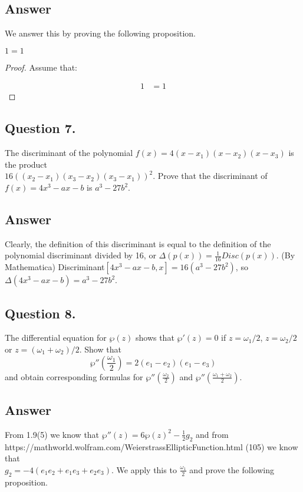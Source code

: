 \subsection*{Answer}
\noindent
We answer this by proving the following proposition.

\begin{proposition}
    $1=1$
\end{proposition}

\begin{proof}
    Assume that:

    \begin{align*}
        1 &= 1
    \end{align*}

\end{proof}


\subsection{Question 7.}
\noindent
The discriminant of the polynomial $f(x) = 4(x - x_1)(x - x_2)(x - x_3)$ is the product \\
$16((x_2 - x_1)(x_3 - x_2)(x_3 - x_1))^2$. Prove that the discriminant of $f(x) =  4x^3 - a x - b$ is $a^3 - 27b^2$.

\subsection*{Answer}
Clearly, the definition of this discriminant is equal to the definition of the polynomial discriminant divided by 16,
or $\Delta(p(x)) = \frac{1}{16} Disc(p(x))$. (By Mathematica) Discriminant$[4x^3 - a x - b, x]=16 (a^3 - 27 b^2)$, so
$\Delta(4x^3 - a x - b) =a^3 - 27b^2$.


\subsection{Question 8.}
\noindent
The differential equation for $\wp(z)$ shows that $\wp'(z)=0$ if $z=\omega_1 / 2$, $z=\omega_2 / 2$ or
$z=(\omega_1 + \omega_2) / 2$. Show that
\[
    \wp''(\frac{\omega_1}{2}) = 2 (e_1 - e_2)(e_1 - e_3)
\]
and obtain corresponding formulas for $\wp''(\frac{\omega_2}{2})$ and $\wp''(\frac{\omega_1 + \omega_2}{2})$.

\subsection*{Answer}
\noindent
From 1.9(5) we know that $\wp''(z)=6{\wp(z)}^2-\frac{1}{2}g_2$ and from\\
https://mathworld.wolfram.com/WeierstrassEllipticFunction.html (105) we know that\\
$g_2=-4(e_1 e_2 + e_1 e_3 + e_2 e_3)$. We apply this to $\frac{\omega_1}{2}$ and prove the following proposition.

